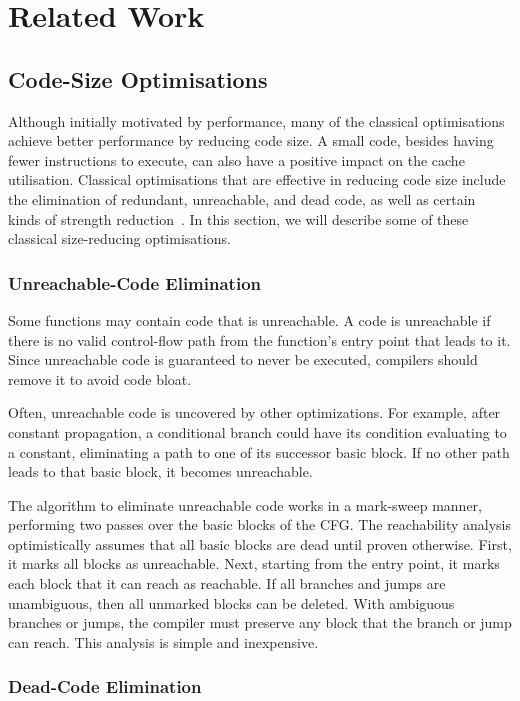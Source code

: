 \chapter{Related Work}

\section{Code-Size Optimisations}

Although initially motivated by performance, many of the classical optimisations achieve better performance by reducing code size.
A small code, besides having fewer instructions to execute, can also have a positive impact on the cache utilisation.
Classical optimisations that are effective in reducing code size include the elimination of redundant, unreachable, and dead code, as well as certain kinds of strength reduction~\cite{cocke70,briggs97,debray00}.
In this section, we will describe some of these classical size-reducing optimisations.

\subsection{Unreachable-Code Elimination}

Some functions may contain code that is unreachable. A code is unreachable if there is no valid control-flow path from the function's entry point that leads to it. Since unreachable code is guaranteed to never be executed, compilers should remove it to avoid code bloat.

Often, unreachable code is uncovered by other optimizations. For example, after constant propagation, a conditional branch could have its condition evaluating to a constant, eliminating a path to one of its successor basic block. If no other path leads to that basic block, it becomes unreachable.

The algorithm to eliminate unreachable code works in a mark-sweep manner, performing two passes over the basic blocks of the CFG. The reachability analysis optimistically assumes that all basic blocks are dead until proven otherwise. First, it marks all blocks as unreachable. Next, starting from the entry point, it marks each block that it can reach as reachable. If all branches and jumps are unambiguous, then all unmarked blocks can be deleted. With ambiguous branches or jumps, the compiler must preserve any block that the branch or jump can reach. This analysis is simple and inexpensive.

\subsection{Dead-Code Elimination}



